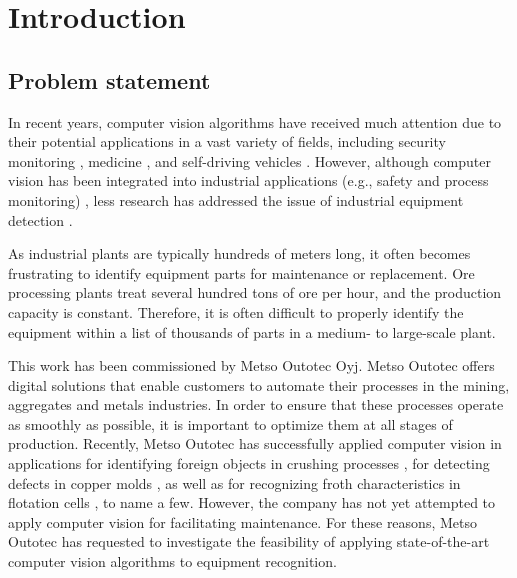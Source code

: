 \section{Introduction}

\thispagestyle{empty}
\subsection{Problem statement}
In recent years, computer vision algorithms have received much attention due to their potential applications in a vast variety of fields, including security monitoring \cite{Awalgaonkar2020}, medicine \cite{9689485}, and self-driving vehicles \cite{Janai2017, Shan2018}. However, although computer vision has been integrated into industrial applications (e.g., safety and process monitoring) \cite{Awalgaonkar2020, Banf2022}, less research has addressed the issue of industrial equipment detection \cite{Wu2022, MALBURG2021581, Kim2020}. 

As industrial plants are typically hundreds of meters long, it often becomes frustrating to identify equipment parts for maintenance or replacement. Ore processing plants treat several hundred tons of ore per hour, and the production capacity is constant. Therefore, it is often difficult to properly identify the equipment within a list of thousands of parts in a medium- to large-scale plant.

This work has been commissioned by Metso Outotec Oyj.  Metso Outotec offers digital solutions that enable customers to automate their processes in the mining, aggregates and metals industries. In order to ensure that these processes operate as smoothly as possible, it is important to optimize them at all stages of production. Recently, Metso Outotec has successfully applied computer vision in applications for identifying foreign objects in crushing processes \cite{metso_outotec_2022}, for detecting defects in copper  molds \cite{metso_outotec_2022_2}, as well as for recognizing froth characteristics in flotation cells \cite{metso_outotec_2022_1}, to name a few. However, the company has not yet attempted to apply computer vision for facilitating maintenance. For these reasons, Metso Outotec has requested to investigate the feasibility of applying state-of-the-art computer vision algorithms to equipment recognition. 

